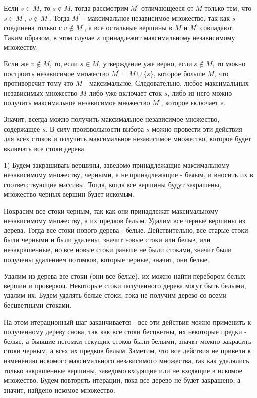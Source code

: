 \documentclass[a4paper,12pt]{article}
\begin{document}
Если $v\in M$, то $s\notin M$, тогда рассмотрим $M^\prime$ отличающееся от $M$ только тем, что $s\in M^\prime$, $v\notin M^\prime$. Тогда $M^\prime$ - максимальное независимое множество, так как $s$ соединена только с $v\notin M^\prime$, а все остальные вершины в $M$ и $M^\prime$ совпадают. Таким образом, в этом случае $s$ принадлежит максимальному независимому множеству. 

Если же $v\notin M$, то, если $s\in M$, утверждение уже верно, если $s\notin M$, то можно построить независимое множество $M^\prime=M\cup\{s\}$, которое больше $M$, что противоречит тому что $M$ - максимальное. Следовательно, любое максимальных независимых множество $M$ либо уже включает сток $s$, либо из него можно получить максимальное независимое множество $M^\prime$, которое включает $s$. 

Значит, всегда можно получить максимальное независимое множество, содержащее $s$. В силу произвольности выбора $s$ можно провести эти действия для всех стоков и получить максимальное независимое множество, которое будет включать все стоки дерева.

1) Будем закрашивать вершины, заведомо принадлежащие максимальному независимому множеству, черными, а не принадлежащие - белым, и вносить их в соответствующие массивы. Тогда, когда все вершины будут закрашены, множество черных вершин будет искомым.  

Покрасим все стоки черным, так как они принадлежат максимальному независимому множеству, а их предков белым. Удалим все черные вершины из дерева. Тогда все стоки нового дерева - белые. Действительно, все старые стоки были черными и были удалены, значит новые стоки или белые, или незакрашенные, но все новые стоки раньше не были стоками, значит были получены удалением потомков, которые черные, значит, они белые. 

Удалим из дерева все стоки (они все белые), их можно найти перебором белых вершин и проверкой. Некоторые стоки полученного дерева могут быть белыми, удалим их. Будем удалять белые стоки, пока не получим дерево со всеми бесцветными стоками.  

На этом итерационный шаг заканчивается - все эти действия можно применить к полученному дереву снова, так как все стоки бесцветны, их некоторые предки - белые, а бывшие потомки текущих стоков были белыми, значит можно закрасить стоки черным, а всех их предков белым. Заметим, что все действия не привели к изменению искомого максимального независимого множества, так как удалялись только закрашенные вершины, заведомо  входящие или не входящие в искомое множество. Будем повторять итерации, пока все дерево не будет закрашено, а значит, найдено искомое множество.
\end{document}
